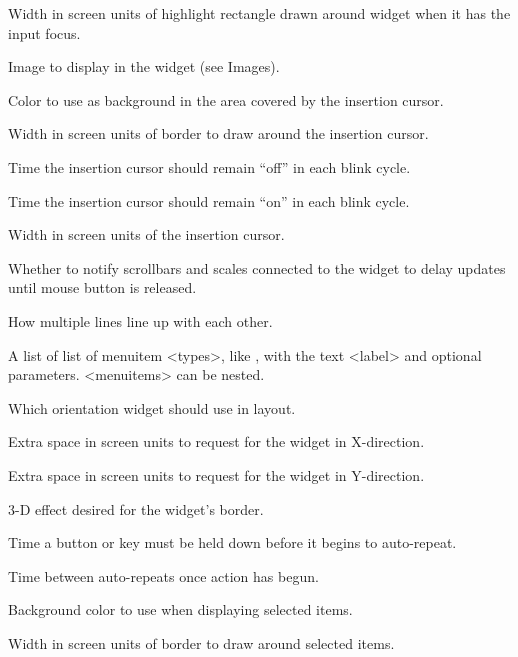 \begin{enum}{1cm}
Width in screen units of highlight rectangle drawn around widget 
when it has the input focus.

Image to display in the widget (see Images).

Color to use as background in the area covered by the insertion
cursor.

Width in screen units of border to draw around the insertion cursor.

Time the insertion cursor should remain ``off'' in each blink cycle.

Time the insertion cursor should remain ``on'' in each blink cycle.

Width in screen units of the insertion cursor.

Whether to notify scrollbars and scales connected
to the widget to delay updates until mouse button is released.

How multiple lines line up with each other.

A list of list of menuitem <types>, like , with the text
<label> and optional parameters.  <menuitems> can be nested.

Which orientation widget should use in layout.

Extra space in screen units to request for the widget in X-direction.

Extra space in screen units to request for the widget in Y-direction.

3-D  effect desired for the widget's border.

Time a button or key must be held down before it begins to
auto-repeat.

Time between auto-repeats once action has begun.

Background color to use when displaying selected items.

Width in screen units of border to draw around selected items.


\end{enum}
